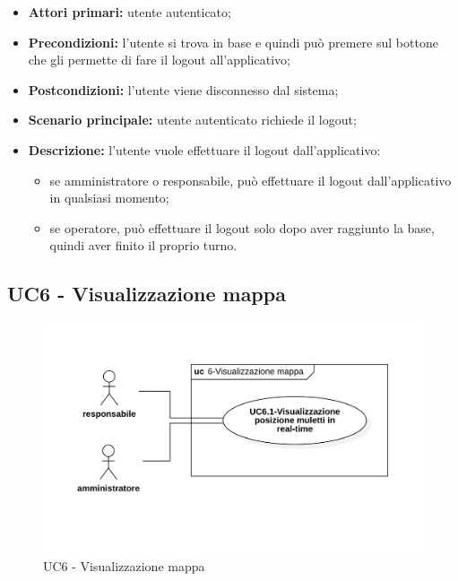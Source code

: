 \begin{itemize}
	\item 	\textbf{Attori primari:} utente autenticato;
	\item 	\textbf{Precondizioni:} l’utente si trova in base e quindi può premere sul bottone che gli permette di fare il logout all’applicativo;
	\item 	\textbf{Postcondizioni:} l'utente viene disconnesso dal sistema;
	\item 	\textbf{Scenario principale:} utente autenticato richiede il logout;
	\item 	\textbf{Descrizione:} l’utente vuole effettuare il logout dall’applicativo:
	\begin{itemize}
		\item se amministratore o responsabile, può effettuare il logout dall’applicativo in qualsiasi momento;
		\item se operatore, può effettuare il logout solo dopo aver raggiunto la base, quindi aver finito il proprio turno.
	\end{itemize}
\end{itemize}


\subsection{UC6 - Visualizzazione mappa}

\begin{figure}[H]
	\centering
	\includegraphics[scale=0.52]{res/images/uc6.png}
	\caption{UC6 - Visualizzazione mappa}
\end{figure}

